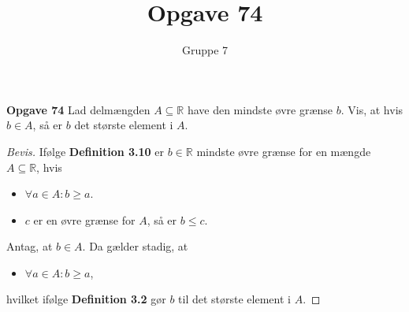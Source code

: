 \documentclass[12pt,a4paper]{report}
\author{Gruppe 7}
\title{Opgave 74}
\begin{document}
\noindent \textbf{Opgave 74} Lad delmængden $A \subseteq \mathbb{R}$ have den mindste øvre grænse $b$. Vis, at hvis $b \in A$, så er $b$ det største element i $A$.
\begin{proof}[Bevis]
Ifølge \textbf{Definition 3.10} er $b \in \mathbb{R}$ mindste øvre grænse for en mængde $A \subseteq \mathbb{R}$, hvis
\begin{itemize}
\item[] $ \forall a \in A : b \geq a$.
\item[] $c$ er en øvre grænse for $A$, så er $b \leq c$.
\end{itemize}
Antag, at $b \in A$. Da gælder stadig, at
\begin{itemize}
\item[] $ \forall a \in A : b \geq a$,
\end{itemize}
hvilket ifølge \textbf{Definition 3.2} gør $b$ til det største element i $A$.
\end{proof}
\end{document}
